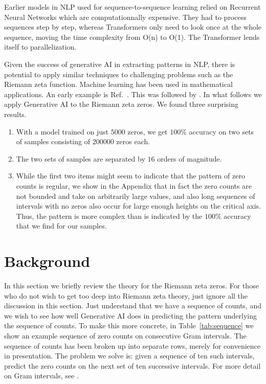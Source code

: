 \documentclass[journal]{IEEEtai}
\begin{document}
Earlier models in NLP used for sequence-to-sequence learning relied on Recurrent Neural Networks which are computationnally expensive. They had to process sequences step by step, whereas Transformers only need to look once at the whole sequence, moving the time complexity from O(n) to O(1). The Transformer lends itself to parallelization. 

Given the success of generative AI in extracting patterns in NLP, there is potential to apply similar techniques to challenging problems such as the Riemann zeta function.
Machine learning has been used in mathematical applications. An early example is  Ref.~\cite{osneural}. This was followed by \cite{he2022sato,HeMLNF,HeStringLandscape,
Vartziotis2023,Kim2022}. In what follows we apply Generative AI to the Riemann zeta zeros.
We found three surprising results.

\begin{enumerate}
    \item With a model trained on just $5000$ zeros, we get $100\%$ accuracy on two sets of samples consisting of $200000$ zeros each.
    
    \item The two sets of samples are separated by $16$ orders of magnitude.
    
    \item While the first two items might seem to indicate that the pattern of zero counts is regular, we show in the Appendix that in fact the zero counts are not bounded and take on arbitrarily large values, and also long sequences of intervals with no zeros also occur for large enough heights on the critical axis. Thus, the pattern is more complex than is indicated by the $100\%$ accuracy that we find for our samples.
    
\end{enumerate}

\section{Background}

In this section we briefly review the theory for the Riemann zeta zeros. For those who do not wish to get too deep into Riemann zeta theory, just ignore all the discussion in this section. Just understand that we have a sequence of counts, and we wish to see how well Generative AI does in predicting the pattern underlying the sequence of counts. To make this more concrete, in Table~\ref{tab:sequence} we show an example sequence of zero counts on consecutive Gram intervals. The sequence of counts has been broken up into separate rows, merely for convenience in presentation. The problem we solve is: given a sequence of ten such intervals, predict the zero counts on the next set of ten successive intervals.
For more detail on Gram intervals, see \cite{Shanker 2018a}.
\end{document}
